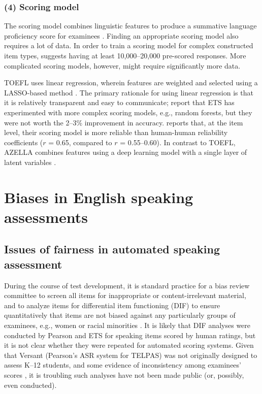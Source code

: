 \documentclass [PhD] {uclathes}
\begin{document}
\subsubsection{(4) Scoring model}

The scoring model combines linguistic features to produce a summative language proficiency score for examinees \citep{loukina2019scoring}. Finding an appropriate scoring model also requires a lot of data. In order to train a scoring model for complex constructed item types, \citet{zechner2019summary} suggests having at least 10,000–20,000 pre-scored responses. More complicated scoring models, however, might require significantly more data.

TOEFL uses linear regression, wherein features are weighted and selected using a LASSO-based method \citep{loukina2015feature}. The primary rationale for using linear regression is that it is relatively transparent and easy to communicate; \citet{loukina2019scoring} report that ETS has experimented with more complex scoring models, e.g., random forests, but they were not worth the 2–3\% improvement in accuracy. \citet{zechner2019summary} reports that, at the item level, their scoring model is more reliable than human-human reliability coefficients ($r$ = 0.65, compared to $r$ = 0.55–0.60). In contrast to TOEFL, AZELLA combines features using a deep learning model with a single layer of latent variables \citep{cheng2014automatic}.

\section{Biases in English speaking assessments}

\subsection{Issues of fairness in automated speaking assessment}

During the course of test development, it is standard practice for a bias review committee to screen all items for inappropriate or content-irrelevant material, and to analyze items for differential item functioning (DIF) to ensure quantitatively that items are not biased against any particularly groups of examinees, e.g., women or racial minorities \citep{aera2014}. It is likely that DIF analyses were conducted by Pearson and ETS for speaking items scored by human ratings, but it is not clear whether they were repeated for automated scoring systems. Given that Versant (Pearson’s ASR system for TELPAS) was not originally designed to assess K–12 students, and some evidence of inconsistency among examinees’ scores \citep{collier2020test}, it is troubling such analyses have not been made public (or, possibly, even conducted).
\end{document}
